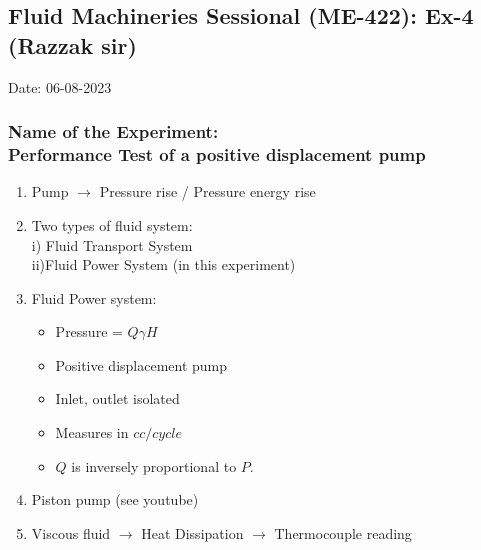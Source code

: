 \documentclass[12pt]{article}
\begin{document}
\subsection*{Fluid Machineries Sessional (ME-422): Ex-4 (Razzak sir)}
\hfill Date: 06-08-2023 
\subsubsection*{Name of the Experiment: \\Performance Test of a positive displacement pump} 
\vspace*{1cm}

\begin{enumerate}
    \item Pump $\rightarrow$ Pressure rise / Pressure energy rise 
    \item Two types of fluid system: \\ i) Fluid Transport System \\ii)Fluid Power System (in this experiment)
    \item Fluid Power system: 
    \begin{itemize}
        \item Pressure = $Q \gamma H$
        \item Positive displacement pump 
        \item Inlet, outlet isolated 
        \item Measures in $cc/cycle$ 
        \item $Q$ is inversely proportional to $P$. 
    \end{itemize}
    \item Piston pump (see youtube)
    \item Viscous fluid $\rightarrow$ Heat Dissipation $\rightarrow$ Thermocouple reading 
\end{enumerate}
\end{document}
